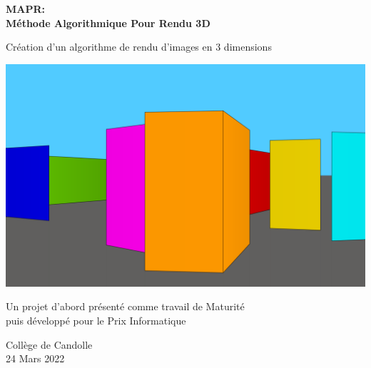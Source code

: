 \begin{titlepage}
	\begin{center}
		\vspace*{1cm}

		\Huge
    \textbf{MAPR: \\ Méthode Algorithmique Pour Rendu 3D}

		\vspace{0.5cm}
		\LARGE
    Création d’un algorithme de rendu d'images en 3 dimensions


		\vspace{1.5cm}

		\textbf{\myauthor}

		\includegraphics{../img/CoverPic/Main_Pic4.png}

		\vfill
		Un projet d'abord présenté comme travail de Maturité \\
		puis développé pour le Prix Informatique
				
		\vspace{0.8cm}
		
		\Large
		Collège de Candolle \\
    24 Mars 2022
	\end{center}
\end{titlepage}



\thispagestyle{empty}
